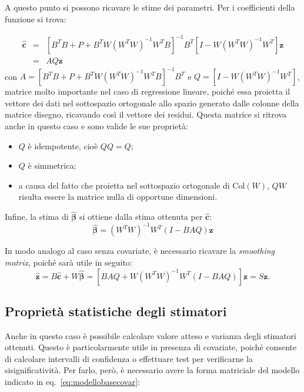\documentclass[a4paper,11pt,twoside,openright]{book}							%
\begin{document}
A questo punto si possono ricavare le stime dei parametri. Per i coefficienti della funzione si trova:

\begin{eqnarray}
 \label{eq:syscovar1}
\hat  {\bm c} &=& [B^TB+P+B^TW(W^TW)^{-1}W^TB]^{-1}B^T[I-W(W^TW)^{-1}W^T]\bm z  \nonumber \\
 &=& AQ \bm z
\end{eqnarray} 
con $A=[B^TB+P+B^TW(W^TW)^{-1}W^TB]^{-1}B^T$ e $Q=[I-W(W^TW)^{-1}W^T]$, matrice molto importante nel caso di regressione lineare, poiché essa proietta il vettore dei dati nel sottospazio ortogonale allo spazio generato dalle colonne della matrice disegno, ricavando così il vettore dei residui. Questa matrice si ritrova anche in questo caso e sono valide le sue proprietà:
\begin{itemize}
\item $Q$ è idempotente, cioè $QQ=Q$;
\item $Q$ è simmetrica;
\item a causa del fatto che proietta nel sottospazio ortogonale di $\mathrm{Col}(W)$, $QW$ risulta essere la matrice nulla di opportune dimensioni. 
\end{itemize}
Infine, la stima di $\hat  {\bm \beta}$ si ottiene dalla stima ottenuta per $\hat  {\bm c}$:
\begin{equation}
\label{eq:syscovar2}
\hat{\bm{\beta}}=(W^TW)^{-1}W^T(I-B AQ)\bm z
\end{equation}

In modo analogo al caso senza covariate, è necessario ricavare la \textit{smoothing matrix}, poiché sarà utile in seguito:
$$
\hat  {\bm z} =B\hat  {\bm c} + W \hat  {\bm \beta} = [B AQ + W(W^TW)^{-1}W^T(I-B AQ)]\bm z = S\bm z .
$$

\subsection{Proprietà statistiche degli stimatori}
\label{sec:IC}
Anche in questo caso è possibile calcolare valore atteso e varianza degli stimatori ottenuti. Questo è particolarmente utile in presenza di covariate, poiché consente di calcolare intervalli di confidenza o effettuare test per verificarne la sisignificatività. Per farlo, però, è necessario avere la forma matriciale del modello indicato in eq.~\ref{eq:modellobasecovar}:
\end{document}
